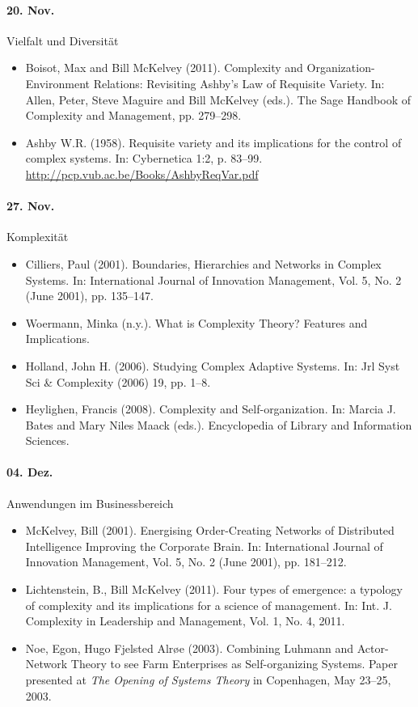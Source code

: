 \documentclass[11pt,a4paper]{article}
\begin{document}
\paragraph{20. Nov.}
Vielfalt und Diversität
\begin{itemize}
\item Boisot, Max and Bill McKelvey (2011). Complexity and
  Organization-Environment Relations: Revisiting Ashby’s Law of Requisite
  Variety. In: Allen, Peter, Steve Maguire and Bill McKelvey (eds.). The
  Sage Handbook of Complexity and Management, pp. 279--298.
\item Ashby W.R. (1958).  Requisite variety and its implications for the
  control of complex systems. In: Cybernetica 1:2, p. 83--99.
  \url{http://pcp.vub.ac.be/Books/AshbyReqVar.pdf}
\end{itemize}

\paragraph{27. Nov.}
Komplexität
\begin{itemize}
\item Cilliers, Paul (2001). Boundaries, Hierarchies and Networks in Complex
  Systems. In: International Journal of Innovation Management, Vol. 5, No. 2
  (June 2001), pp. 135–147.
\item Woermann, Minka (n.y.). What is Complexity Theory? Features and
  Implications. 
\item Holland, John H. (2006). Studying Complex Adaptive Systems. In: Jrl Syst
  Sci \& Complexity (2006) 19, pp. 1–8.
\item Heylighen, Francis (2008). Complexity and Self-organization. In: Marcia
  J. Bates and Mary Niles Maack (eds.). Encyclopedia of Library and
  Information Sciences.
\end{itemize}

  
\paragraph{04. Dez.}
Anwendungen im Businessbereich
\begin{itemize}
\item McKelvey, Bill (2001). Energising Order-Creating Networks of Distributed
  Intelligence Improving the Corporate Brain. In: International Journal of
  Innovation Management, Vol. 5, No. 2 (June 2001), pp. 181–212.
\item Lichtenstein, B., Bill McKelvey (2011). Four types of emergence: a
  typology of complexity and its implications for a science of management. In:
  Int. J. Complexity in Leadership and Management, Vol. 1, No. 4, 2011.
\item Noe, Egon, Hugo Fjelsted Alrøe (2003). Combining Luhmann and
  Actor-Network Theory to see Farm Enterprises as Self-organizing Systems.
  Paper presented at \emph{The Opening of Systems Theory} in Copenhagen, May
  23--25, 2003.
\end{itemize}
\end{document}
